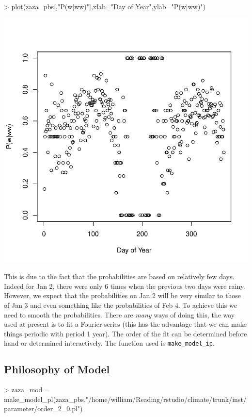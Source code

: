 \documentclass{article}
\begin{document}
\begin{Schunk}
\begin{Sinput}
> plot(zaza_pbs[,"P(w|ww)"],xlab="Day of Year",ylab="P(w|ww)")
\end{Sinput}
\end{Schunk}
\includegraphics{climate_vignette-007}

This is due to the fact that the probabilities are based on
relatively few days.  Indeed for Jan 2, there were only 6
times when the previous two days were rainy.  However, we expect
that the probabilities on Jan 2 will be very similar to those
of Jan 3 and even something like the probabilities of Feb 4.
To achieve this we need to smooth the probabilities.  There are {\it many}
ways of doing this, the way used at present is to fit a Fourier series (this
has the advantage that we can make things periodic with period 1 year).
The order of the fit can be determined before hand or determined
interactively. The function used is {\tt make\_model\_ip}.

\subsection{Philosophy of Model}


\begin{Schunk}
\begin{Sinput}
>    zaza_mod = make_model_pl(zaza_pbs,"/home/william/Reading/rstudio/climate/trunk/inst/parameter/order_2_0.pl")
\end{Sinput}
\end{Schunk}
\end{document}
